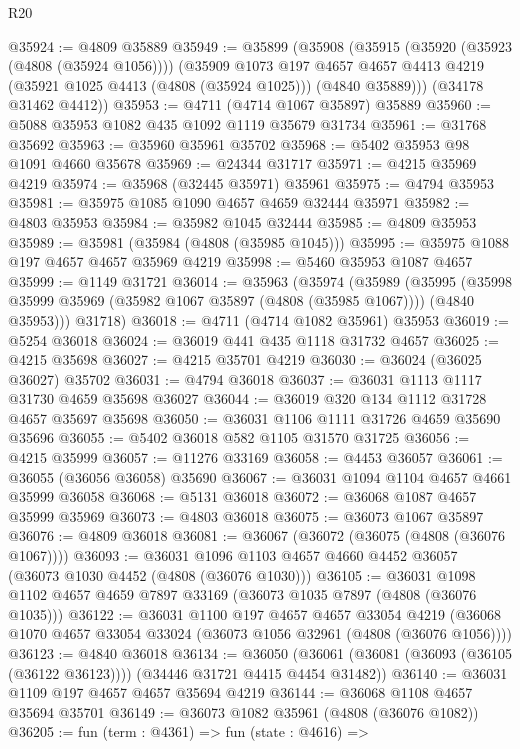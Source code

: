 \begin{lexlean}{R20}
\begin{coremodule}
@35924 := @4809 @35889
@35949 := @35899
    (@35908
      (@35915
        (@35920 (@35923 (@4808 (@35924 @1056))))
        (@35909
          @1073
          @197
          @4657
          @4657
          @4413
          @4219
          (@35921 @1025 @4413 (@4808 (@35924 @1025)))
          (@4840 @35889)))
      (@34178 @31462 @4412))
@35953 := @4711 (@4714 @1067 @35897) @35889
@35960 := @5088 @35953 @1082 @435 @1092 @1119 @35679 @31734
@35961 := @31768 @35692
@35963 := @35960 @35961 @35702
@35968 := @5402 @35953 @98 @1091 @4660 @35678
@35969 := @24344 @31717
@35971 := @4215 @35969 @4219
@35974 := @35968 (@32445 @35971) @35961
@35975 := @4794 @35953
@35981 := @35975 @1085 @1090 @4657 @4659 @32444 @35971
@35982 := @4803 @35953
@35984 := @35982 @1045 @32444
@35985 := @4809 @35953
@35989 := @35981 (@35984 (@4808 (@35985 @1045)))
@35995 := @35975 @1088 @197 @4657 @4657 @35969 @4219
@35998 := @5460 @35953 @1087 @4657
@35999 := @1149 @31721
@36014 := @35963
    (@35974
      (@35989
        (@35995 (@35998 @35999 @35969 (@35982 @1067 @35897 (@4808 (@35985 @1067)))) (@4840 @35953)))
      @31718)
@36018 := @4711 (@4714 @1082 @35961) @35953
@36019 := @5254 @36018
@36024 := @36019 @441 @435 @1118 @31732 @4657
@36025 := @4215 @35698
@36027 := @4215 @35701 @4219
@36030 := @36024 (@36025 @36027) @35702
@36031 := @4794 @36018
@36037 := @36031 @1113 @1117 @31730 @4659 @35698 @36027
@36044 := @36019 @320 @134 @1112 @31728 @4657 @35697 @35698
@36050 := @36031 @1106 @1111 @31726 @4659 @35690 @35696
@36055 := @5402 @36018 @582 @1105 @31570 @31725
@36056 := @4215 @35999
@36057 := @11276 @33169
@36058 := @4453 @36057
@36061 := @36055 (@36056 @36058) @35690
@36067 := @36031 @1094 @1104 @4657 @4661 @35999 @36058
@36068 := @5131 @36018
@36072 := @36068 @1087 @4657 @35999 @35969
@36073 := @4803 @36018
@36075 := @36073 @1067 @35897
@36076 := @4809 @36018
@36081 := @36067 (@36072 (@36075 (@4808 (@36076 @1067))))
@36093 := @36031 @1096 @1103 @4657 @4660 @4452 @36057 (@36073 @1030 @4452 (@4808 (@36076 @1030)))
@36105 := @36031 @1098 @1102 @4657 @4659 @7897 @33169 (@36073 @1035 @7897 (@4808 (@36076 @1035)))
@36122 := @36031
    @1100
    @197
    @4657
    @4657
    @33054
    @4219
    (@36068 @1070 @4657 @33054 @33024 (@36073 @1056 @32961 (@4808 (@36076 @1056))))
@36123 := @4840 @36018
@36134 := @36050
    (@36061 (@36081 (@36093 (@36105 (@36122 @36123)))) (@34446 @31721 @4415 @4454 @31482))
@36140 := @36031 @1109 @197 @4657 @4657 @35694 @4219
@36144 := @36068 @1108 @4657 @35694 @35701
@36149 := @36073 @1082 @35961 (@4808 (@36076 @1082))
@36205 := fun (term : @4361) =>
  fun (state : @4616) =>

\end{coremodule}
\end{lexlean}
